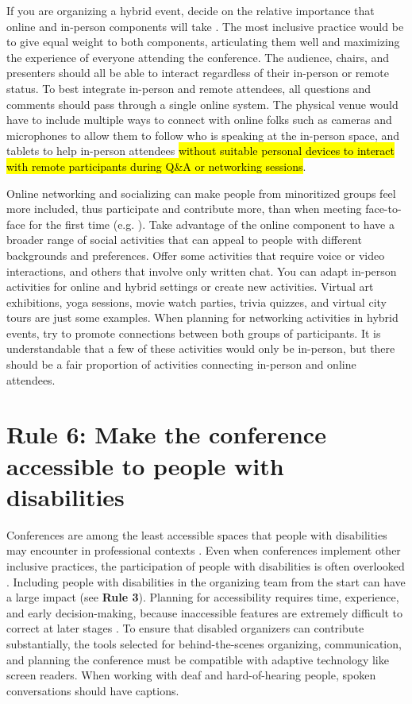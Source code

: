 \documentclass[10pt,letterpaper]{article}
\begin{document}
If you are organizing a hybrid event, decide on the relative importance that online and in-person components will take \cite{bajpai_towards_2021}. The most inclusive practice would be to give equal weight to both components, articulating them well and maximizing the experience of everyone attending the conference.
The audience, chairs, and presenters should all be able to interact regardless of their in-person or remote status. 
To best integrate in-person and remote attendees, all questions and comments should pass through a single online system. 
The physical venue would have to include multiple ways to connect with online folks such as cameras and microphones to allow them to follow who is speaking at the in-person space, and tablets to help in-person attendees \hl{without suitable personal devices to interact with remote participants during Q\&A or networking sessions}.

Online networking and socializing can make people from minoritized groups feel more included, thus participate and contribute more, than when meeting face-to-face for the first time (e.g. \cite{trianaDoesOrderFacetoFace2012,blackEngenderingBelongingThoughtful2020}).
Take advantage of the online component to have a broader range of social activities that can appeal to people with different backgrounds and preferences.
Offer some activities that require voice or video interactions, and others that involve only written chat.
You can adapt in-person activities for online and hybrid settings or create new activities. 
Virtual art exhibitions, yoga sessions, movie watch parties, trivia quizzes, and virtual city tours are just some examples.
When planning for networking activities in hybrid events, try to
promote connections between both groups of participants.
It is understandable that a few of these activities would only be in-person, but 
there should be a fair proportion of activities connecting in-person and online attendees. 


\section*{Rule 6: Make the conference accessible to people with disabilities}
\label{rule_accessibility}

Conferences are among the least accessible spaces that people with disabilities may encounter in professional contexts \cite{priceAccessImaginedConstruction2009}. Even when conferences implement other inclusive practices, the participation of people with disabilities is often overlooked \cite{marks2021meeting}. Including people with disabilities in the organizing team from the start can have a large impact (see \textbf{Rule 3}). Planning for accessibility requires time, experience, and early decision-making, because inaccessible features are extremely difficult to correct at later stages \cite{irishIncreasingParticipationUsing2020}. To ensure that disabled organizers can contribute substantially, the tools selected for behind-the-scenes organizing, communication, and planning the conference must be compatible with adaptive technology like screen readers. When working with deaf and hard-of-hearing people, spoken conversations should have captions.
\end{document}
